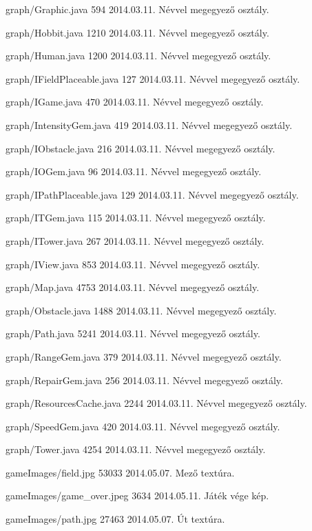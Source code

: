 \begin{fajllista}
\fajl
{graph/Graphic.java}
{594}
{2014.03.11.}
{Névvel megegyező osztály.}

\fajl
{graph/Hobbit.java}
{1210}
{2014.03.11.}
{Névvel megegyező osztály.}

\fajl
{graph/Human.java}
{1200}
{2014.03.11.}
{Névvel megegyező osztály.}

\fajl
{graph/IFieldPlaceable.java}
{127}
{2014.03.11.}
{Névvel megegyező osztály.}

\fajl
{graph/IGame.java}
{470}
{2014.03.11.}
{Névvel megegyező osztály.}

\fajl
{graph/IntensityGem.java}
{419}
{2014.03.11.}
{Névvel megegyező osztály.}

\fajl
{graph/IObstacle.java}
{216}
{2014.03.11.}
{Névvel megegyező osztály.}

\fajl
{graph/IOGem.java}
{96}
{2014.03.11.}
{Névvel megegyező osztály.}

\fajl
{graph/IPathPlaceable.java}
{129}
{2014.03.11.}
{Névvel megegyező osztály.}

\fajl
{graph/ITGem.java}
{115}
{2014.03.11.}
{Névvel megegyező osztály.}

\fajl
{graph/ITower.java}
{267}
{2014.03.11.}
{Névvel megegyező osztály.}

\fajl
{graph/IView.java}
{853}
{2014.03.11.}
{Névvel megegyező osztály.}

\fajl
{graph/Map.java}
{4753}
{2014.03.11.}
{Névvel megegyező osztály.}

\fajl
{graph/Obstacle.java}
{1488}
{2014.03.11.}
{Névvel megegyező osztály.}

\fajl
{graph/Path.java}
{5241}
{2014.03.11.}
{Névvel megegyező osztály.}

\fajl
{graph/RangeGem.java}
{379}
{2014.03.11.}
{Névvel megegyező osztály.}

\fajl
{graph/RepairGem.java}
{256}
{2014.03.11.}
{Névvel megegyező osztály.}

\fajl
{graph/ResourcesCache.java}
{2244}
{2014.03.11.}
{Névvel megegyező osztály.}

\fajl
{graph/SpeedGem.java}
{420}
{2014.03.11.}
{Névvel megegyező osztály.}

\fajl
{graph/Tower.java}
{4254}
{2014.03.11.}
{Névvel megegyező osztály.}

\fajl
{gameImages/field.jpg}
{53033}
{2014.05.07.}
{Mező textúra.}

\fajl
{gameImages/game\_{}over.jpeg}
{3634}
{2014.05.11.}
{Játék vége kép.}

\fajl
{gameImages/path.jpg}
{27463}
{2014.05.07.}
{Út textúra.}


\end{fajllista}
